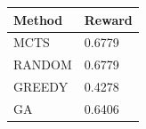 \begin{tabular}{ll}
\hline
Method & Reward \\
\hline
  MCTS & 0.6779 \\
  RANDOM & 0.6779 \\
  GREEDY & 0.4278 \\
  GA & 0.6406 \\
\hline
\end{tabular}
